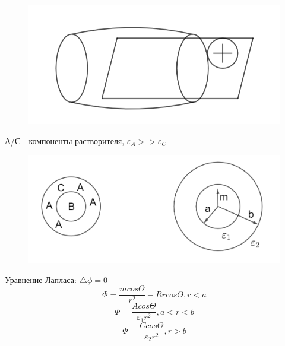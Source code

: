 \begin{lecture}
\begin{lecSection}[Кавитанты]
\begin{figure}[H]
\begin{minipage}[h]{0.49\linewidth}
	\end{minipage}
	\hfill
	\begin{minipage}[h]{0.49\linewidth}
		\centering\includegraphics[width=\linewidth]{lecture_09/pic5}
	\end{minipage}
	
\end{figure}
	
\end{lecSection}

\begin{lecSection}
	
А/С - компоненты растворителя, $\varepsilon_A >> \varepsilon_C$

		\begin{figure}[H]
	
	\centering\includegraphics[width=\linewidth]{lecture_09/pic6}
	
\end{figure}	

Уравнение Лапласа: $\bigtriangleup \phi = 0$
$$\Phi = \dfrac{m cos \Theta}{r^2} - Rr cos \Theta, r < a$$
$$\Phi = \dfrac{Acos \Theta}{\varepsilon_1 r^2}, a < r < b$$
$$\Phi = \dfrac{Ccos \Theta}{\varepsilon_2 r^2}, r > b$$


\end{lecSection}
\end{lecture}
